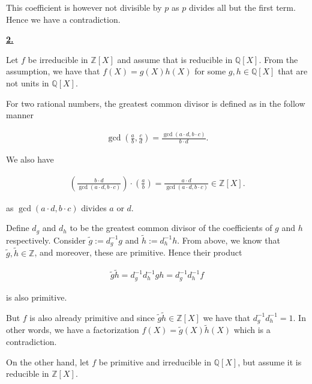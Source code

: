 \documentclass[a4paper]{article}
\theoremstyle{definition}
\begin{document}
\noindent This coefficient is however not divisible by \(p\) as \(p\) divides all but the first term. Hence we have a contradiction.

\noindent \underline{\textbf{2.}}

\noindent Let \(f\) be irreducible in \(\mathbb{Z}[X]\) and assume that is reducible in \(\mathbb{Q}[X]\). From the assumption, we have that \(f(X) = g(X)h(X)\) for some \(g, h \in \mathbb{Q}[X]\) that are not units in \(\mathbb{Q}[X]\).

\bigskip

\noindent For two rational numbers, the greatest common divisor is defined as in the follow manner

\begin{align}
    \gcd \left( \frac{a}{b}, \frac{c}{d} \right) = \frac{\gcd(a \cdot d, b \cdot c)} {b \cdot d} \text{.}
\end{align}

\noindent We also have

\begin{align}
    \left(\frac{b \cdot d}{\gcd(a \cdot d, b \cdot c)}\right) \cdot \left( \frac{a}{b} \right) = \frac{a \cdot d}{\gcd(a \cdot d, b \cdot c)} \in \mathbb{Z}[X] \text{.}
\end{align}

\noindent as \(\gcd(a \cdot d, b \cdot c)\) divides \(a\) or \(d\).

\bigskip

\noindent Define \(d_g\) and \(d_h\) to be the greatest common divisor of the coefficients of \(g\) and \(h\) respectively. Consider \(\tilde{g} := d_g^{-1} g\) and \(\tilde{h} := d_h^{-1} h\). From above, we know that \(\tilde{g}, \tilde{h} \in \mathbb{Z}\), and moreover, these are primitive. Hence their product

\begin{align}
    \tilde{g}\tilde{h} = d_g^{-1} d_h^{-1} g h = d_g^{-1} d_h^{-1} f
\end{align}

\noindent is also primitive.

\bigskip

\noindent But \(f\) is also already primitive and since \(\tilde{g}\tilde{h} \in \mathbb{Z}[X]\) we have that \(d_g^{-1} d_h^{-1} = 1\). In other words, we have a factorization \(f(X) = \tilde{g}(X) \tilde{h}(X)\) which is a contradiction.

\bigskip
\bigskip

\noindent On the other hand, let \(f\) be primitive and irreducible in \(\mathbb{Q}[X]\), but assume it is reducible in \(\mathbb{Z}[X]\).
\end{document}
